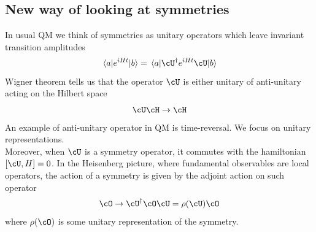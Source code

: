 \documentclass[11pt]{article}
\theoremstyle{definition}
\numberwithin{equation}{section}
\begin{document}
\subsection{New way of looking at symmetries}
In usual QM we think of symmetries as unitary operators which leave invariant transition amplitudes
\begin{equation}
	\mel{a}{e^{iHt}}{b}=\mel{a}{\cU^{\dagger}e^{iHt}\cU}{b}
\end{equation}
Wigner theorem tells us that the operator $\cU$ is either unitary of anti-unitary acting on the Hilbert space
\begin{equation}
	\cU\cH\rightarrow \cH
\end{equation}
An example of anti-unitary operator in QM is time-reversal. We focus on unitary representations.\\
Moreover, when $\cU$ is a symmetry operator, it commutes with the hamiltonian $\comm{\cU}{H}=0$. In the Heisenberg picture, where fundamental observables are local operators, the action of a symmetry is given by the adjoint action on such operator
\begin{equation}
	\cO\rightarrow \cU^{\dagger} \cO \cU=\rho(\cU)\cO
\end{equation}
where $\rho(\cO)$ is some unitary representation of the symmetry.
\end{document}
